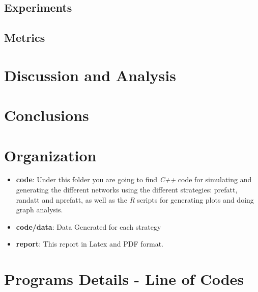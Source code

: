 \documentclass[12pt, a4paper]{article}
\begin{document}
\subsection{Experiments}

\subsection{Metrics}

\section{Discussion and Analysis}
\section{Conclusions}




\appendix
\section{Organization}

\begin{itemize}
    \item \textbf{code}: Under this folder you are going to find \textit{C++} code for simulating and generating the different networks using the different strategies: \acrfull{prefatt}, \acrfull{randatt} and \acrfull{nprefatt}, as well as the \textit{R} scripts for generating plots and doing graph analysis.
    \item \textbf{code/data}: Data Generated for each strategy
    \item \textbf{report}: This report in Latex and PDF format.
\end{itemize}

\section{Programs Details - Line of Codes}
\end{document}
